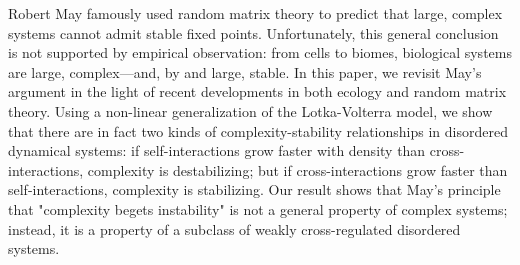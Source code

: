 Robert May famously used random matrix theory to predict that large, complex systems cannot admit stable fixed points. 
Unfortunately, this general conclusion is not supported by empirical observation: from cells to biomes, biological systems are large, complex---and, by and large, stable.
In this paper, we revisit May's argument in the light of recent developments in both ecology and random matrix theory. 
Using a non-linear generalization of the Lotka-Volterra model, we show that there are in fact two kinds of complexity-stability relationships in disordered dynamical systems: 
if self-interactions grow faster with density than cross-interactions, complexity is destabilizing; but if cross-interactions grow faster than self-interactions, complexity is stabilizing.
Our result shows that May's principle that "complexity begets instability" is not a general property of complex systems; instead, it is a property of a subclass of weakly cross-regulated disordered systems.